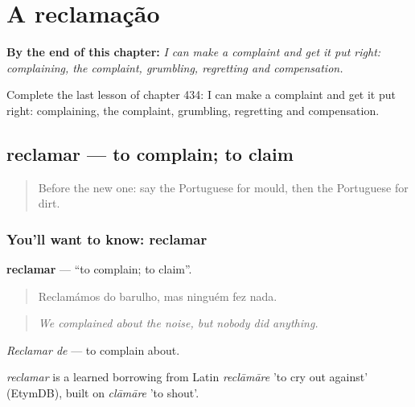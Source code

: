 
\chapter{A reclamação}
\label{ch:pt-a-reclamacao}

\begin{chapteropening}
\textbf{By the end of this chapter:} \emph{I can make a complaint and get it put right: complaining, the complaint, grumbling, regretting and compensation.}

Complete the last lesson of chapter 434: I can make a complaint and get it put right: complaining, the complaint, grumbling, regretting and compensation.
\end{chapteropening}

\section[reclamar]{reclamar — to complain; to claim}

\label{lesson:PT-C434-reclamar}



\begin{quote}
Before the new one: say the Portuguese for mould, then the Portuguese for dirt.
\end{quote}

\subsection*{You'll want to know: reclamar}
\textbf{reclamar} — \textquotedblleft{}to complain; to claim\textquotedblright{}.

\begin{quote}
Reclamámos do barulho, mas ninguém fez nada.
\end{quote}

\begin{quote}
\emph{We complained about the noise, but nobody did anything.}
\end{quote}

\emph{Reclamar de} — to complain about.

\begin{cousinweb}
\emph{reclamar} is a learned borrowing from Latin \emph{reclāmāre} 'to cry out against' (EtymDB), built on \emph{clāmāre} 'to shout'.
\end{cousinweb}

